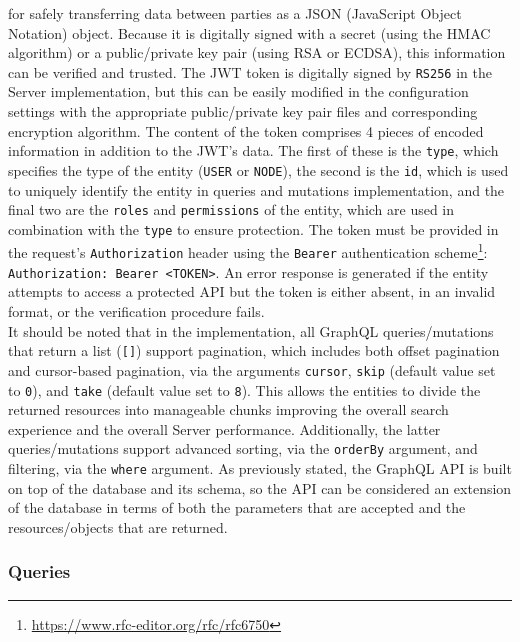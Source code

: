 for safely transferring data between parties as a JSON (JavaScript Object
Notation) object. Because it is digitally signed with a secret (using the HMAC algorithm)
or a public/private key pair (using RSA or ECDSA), this information can be verified
and trusted\cite{rfc_7519}. The JWT token is digitally signed by \texttt{RS256}
in the Server implementation, but this can be easily modified in the configuration
settings with the appropriate public/private key pair files and corresponding encryption
algorithm. The content of the token comprises 4 pieces of encoded information in
addition to the JWT's data. The first of these is the \texttt{type}, which specifies
the type of the entity (\texttt{USER} or \texttt{NODE}), the second is the
\texttt{id}, which is used to uniquely identify the entity in queries and
mutations implementation, and the final two are the \texttt{roles} and \texttt{permissions}
of the entity, which are used in combination with the \texttt{type} to ensure protection.
The token must be provided in the request's \texttt{Authorization} header using the
\texttt{Bearer} authentication scheme\footnote{\url{https://www.rfc-editor.org/rfc/rfc6750}}:
\texttt{Authorization: Bearer <TOKEN>}. An error response is generated if the
entity attempts to access a protected API but the token is either absent, in an invalid
format, or the verification procedure fails. \\ %
It should be noted that in the implementation, all GraphQL queries/mutations that
return a list (\texttt{[]}) support pagination, which includes both offset
pagination and cursor-based pagination, via the arguments \texttt{cursor}, \texttt{skip}
(default value set to \texttt{0}), and \texttt{take} (default value set to
\texttt{8}). This allows the entities to divide the returned resources into manageable
chunks improving the overall search experience and the overall Server performance.
Additionally, the latter queries/mutations support advanced sorting, via the
\texttt{orderBy} argument, and filtering, via the \texttt{where} argument. As previously
stated, the GraphQL API is built on top of the database and its schema, so the API
can be considered an extension of the database in terms of both the parameters that
are accepted and the resources/objects that are returned.

\subsubsection{Queries}
\label{subsubsec:implementation_server_graphql_api_queries}


